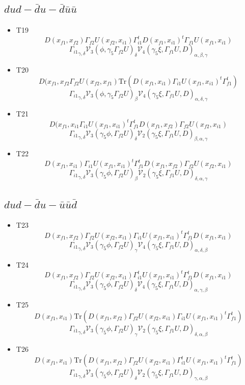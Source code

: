 \documentclass{article}[12pt]
\begin{document}
\subsection{$dud-\bar{d}u-\bar{d}\bar{u}\bar{u}$}
\begin{itemize}
\item T19
$$D(x_{f1},x_{f2})\Gamma_{f2}U(x_{f2},x_{i1})\Gamma_{i1}^tD(x_{f1},x_{i1})^t\Gamma_{f1}U(x_{f1},x_{i1})$$
$${\Gamma_{i1}}_{\gamma,\delta}{\mathcal V}_3\left(\phi,\gamma_5\Gamma_{f2}U\right)_{\delta}{\mathcal V}_4\left(\gamma_5\xi,\Gamma_{f1}U,D\right)_{\alpha,\beta,\gamma}$$
\item T20
$$D(x_{f1},x_{f2}\Gamma_{f2}U(x_{f2},x_{f1})\mathrm{Tr}\left(D(x_{f1},x_{i1})\Gamma_{i1}U(x_{f1},x_{i1})^t\Gamma_{f1}^t\right)$$
$${\Gamma_{i1}}_{\gamma,\delta}{\mathcal V}_3\left(\phi,\gamma_5\Gamma_{f2}U\right)_{\beta}{\mathcal V}_4\left(\gamma_5\xi, \Gamma_{f1}U,D\right)_{\alpha,\delta,\gamma}$$
\item T21
$$D(x_{f1},x_{i1}\Gamma_{i1}U(x_{f1},x_{i1})^t\Gamma_{f1}^tD(x_{f1},x_{f2})\Gamma_{f2}U(x_{f2},x_{i1})$$
$${\Gamma_{i1}}_{\gamma,\delta}{\mathcal V}_3\left(\gamma_5\phi,\Gamma_{f2}U\right)_{\delta}{\mathcal V}_2\left(\gamma_5\xi,\Gamma_{f1}U,D\right)_{\beta,\alpha,\gamma}$$
\item T22
$$D(x_{f1},x_{i1})\Gamma_{i1}U(x_{f1},x_{i1})^t\Gamma_{f1}^t D(x_{f1},x_{f2})\Gamma_{f2}U(x_{f2},x_{i1})$$
$${\Gamma_{i1}}_{\gamma,\delta}{\mathcal V}_3\left(\gamma_5\phi,\Gamma_{f2}U\right)_{\beta}{\mathcal V}_2\left(\gamma_5\xi, \Gamma_{f1}U,D\right)_{\delta,\alpha,\gamma}$$
\end{itemize}
\subsection{$dud-\bar{d}u-\bar{u}\bar{u}\bar{d}$}
\begin{itemize}
\item T23
$$D(x_{f1},x_{f2})\Gamma_{f2}U(x_{f2},x_{i1})\Gamma_{i1}U(x_{f1},x_{i1})^t\Gamma_{f1}^tD(x_{f1},x_{i1})$$
$${\Gamma_{i1}}_{\gamma,\delta}{\mathcal V}_3\left(\gamma_5\phi,\Gamma_{f2}U\right)_{\gamma}{\mathcal V}_4\left(\gamma_5\xi,\Gamma_{f1}U,D\right)_{\alpha,\delta,\beta}$$
\item T24
$$D(x_{f1},x_{f2})\Gamma_{f2}U(x_{f2},x_{i1})\Gamma_{i1}^tU(x_{f1},x_{i1})^t\Gamma_{f1}^tD(x_{f1},x_{i1})$$
$${\Gamma_{i1}}_{\gamma,\delta}{\mathcal V}_3\left(\gamma_5\phi,\Gamma_{f2}U\right)_{\delta}{\mathcal V}_4\left(\gamma_5\xi,\Gamma_{f1}U,D\right)_{\alpha,\gamma,\beta}$$
\item T25
$$D(x_{f1},x_{i1})\mathrm{Tr}\left(D(x_{f1},x_{f2})\Gamma_{f2}U(x_{f2},x_{i1})\Gamma_{i1}U(x_{f1},x_{i1})^t\Gamma_{f1}^t\right)$$
$${\Gamma_{i1}}_{\gamma,\delta}{\mathcal V}_3\left(\gamma_5\phi,\Gamma_{f2}U\right)_{\gamma}{\mathcal V}_2\left(\gamma_5\xi,\Gamma_{f1}U,D\right)_{\delta,\alpha,\beta}$$
\item T26
$$D(x_{f1},x_{i1})\mathrm{Tr}\left(D(x_{f1},x_{f2})\Gamma_{f2}U(x_{f2},x_{i1})\Gamma_{i1}^tU(x_{f1},x_{i1})^t\Gamma_{f1}^t\right)$$
$${\Gamma_{i1}}_{\gamma,\delta}{\mathcal V}_3\left(\gamma_5\phi,\Gamma_{f2}U\right)_{\delta}{\mathcal V}_2\left(\gamma_5\xi,\Gamma_{f1}U,D\right)_{\gamma,\alpha,\beta}$$
\end{itemize}
\end{document}
